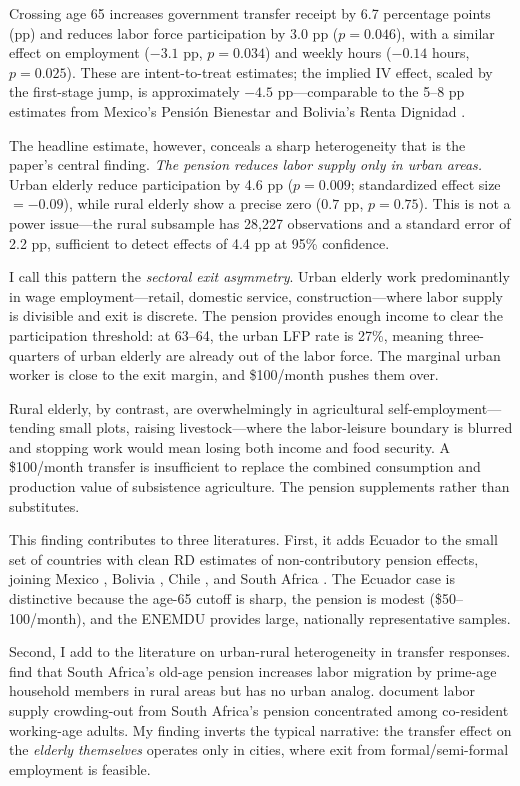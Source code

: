 \documentclass[12pt]{article}
\begin{document}
Crossing age 65 increases government transfer receipt by 6.7 percentage points (pp) and reduces labor force participation by 3.0 pp ($p = 0.046$), with a similar effect on employment ($-3.1$ pp, $p = 0.034$) and weekly hours ($-0.14$ hours, $p = 0.025$). These are intent-to-treat estimates; the implied IV effect, scaled by the first-stage jump, is approximately $-4.5$ pp---comparable to the 5--8 pp estimates from Mexico's Pensi\'{o}n Bienestar \citep{juarez2014} and Bolivia's Renta Dignidad \citep{martinez2004}.

The headline estimate, however, conceals a sharp heterogeneity that is the paper's central finding. \textit{The pension reduces labor supply only in urban areas.} Urban elderly reduce participation by 4.6 pp ($p = 0.009$; standardized effect size $= -0.09$), while rural elderly show a precise zero ($0.7$ pp, $p = 0.75$). This is not a power issue---the rural subsample has 28,227 observations and a standard error of 2.2 pp, sufficient to detect effects of 4.4 pp at 95\% confidence.

I call this pattern the \textit{sectoral exit asymmetry}. Urban elderly work predominantly in wage employment---retail, domestic service, construction---where labor supply is divisible and exit is discrete. The pension provides enough income to clear the participation threshold: at 63--64, the urban LFP rate is 27\%, meaning three-quarters of urban elderly are already out of the labor force. The marginal urban worker is close to the exit margin, and \$100/month pushes them over.

Rural elderly, by contrast, are overwhelmingly in agricultural self-employment---tending small plots, raising livestock---where the labor-leisure boundary is blurred and stopping work would mean losing both income and food security. A \$100/month transfer is insufficient to replace the combined consumption and production value of subsistence agriculture. The pension supplements rather than substitutes.

This finding contributes to three literatures. First, it adds Ecuador to the small set of countries with clean RD estimates of non-contributory pension effects, joining Mexico \citep{juarez2014,galiani2016}, Bolivia \citep{martinez2004}, Chile \citep{miglino2023}, and South Africa \citep{ardington2009}. The Ecuador case is distinctive because the age-65 cutoff is sharp, the pension is modest (\$50--100/month), and the ENEMDU provides large, nationally representative samples.

Second, I add to the literature on urban-rural heterogeneity in transfer responses. \citet{ardington2009} find that South Africa's old-age pension increases labor migration by prime-age household members in rural areas but has no urban analog. \citet{bertrand2003} document labor supply crowding-out from South Africa's pension concentrated among co-resident working-age adults. My finding inverts the typical narrative: the transfer effect on the \textit{elderly themselves} operates only in cities, where exit from formal/semi-formal employment is feasible.
\end{document}
